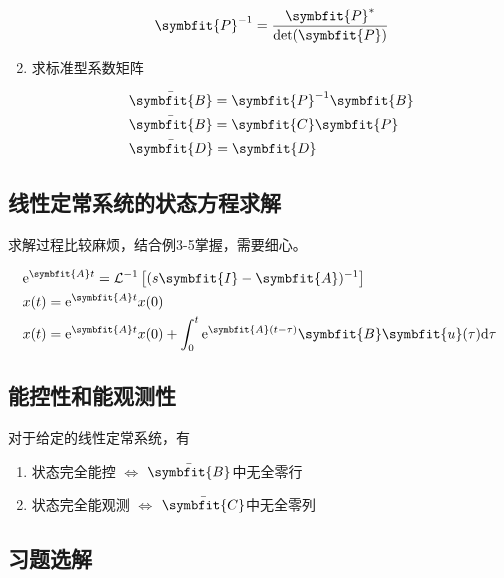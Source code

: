 \begin{enumerate}
    \begin{equation}
        \symbfit{P}^{-1} = \frac{\symbfit{P}^*}{\det(\symbfit{P})}
    \end{equation}
    \item 求标准型系数矩阵
    
    \begin{align}
        & \bar{\symbfit{B}} = \symbfit{P}^{-1} \symbfit{B} \\
        & \bar{\symbfit{B}} = \symbfit{C} \symbfit{P} \\
        & \bar{\symbfit{D}} = \symbfit{D}
    \end{align}
\end{enumerate}

\subsection{线性定常系统的状态方程求解}

求解过程比较麻烦，结合例3-5掌握，需要细心。

\begin{align}
    & {\rm{e}}^{\symbfit{A}t} = \mathcal{L}^{-1} \left[(s \symbfit{I} - \symbfit{A})^{-1}\right] \\
    & x(t) = {\rm{e}}^{\symbfit{A}t} x(0) \\
    & x(t) = {\rm{e}}^{\symbfit{A}t} x(0) + \int_{0}^{t} {\rm{e}}^{\symbfit{A}(t-\tau)} \symbfit{B} \symbfit{u}(\tau) {\rm d} \tau
\end{align}

\subsection{能控性和能观测性}

对于给定的线性定常系统，有

\begin{enumerate}
    \item 状态完全能控 $\Longleftrightarrow$ $\bar{\symbfit{B}}$中无全零行
    \item 状态完全能观测 $\Longleftrightarrow$ $\bar{\symbfit{C}}$中无全零列
\end{enumerate}

\subsection{习题选解}

